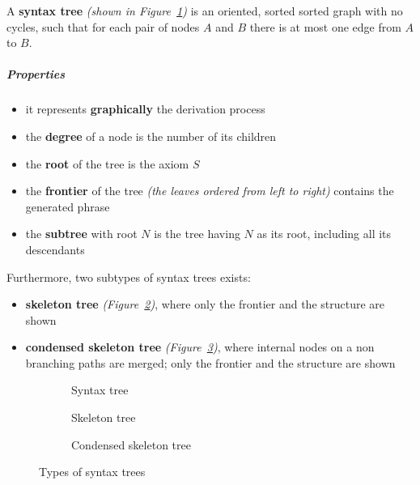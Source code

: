 \documentclass[english]{article}
\begin{document}
A \textbf{syntax tree} \textit{(shown in Figure~\ref{subfig:syntax-tree})} is an oriented, sorted sorted graph with no cycles, such that for each pair of nodes \(A\) and \(B\) there is at most one edge from \(A\) to \(B\).

\subparagraph*{Properties}

\begin{itemize}
  \item it represents \textbf{graphically} the derivation process
  \item the \textbf{degree} of a node is the number of its children
  \item the \textbf{root} of the tree is the axiom \(S\)
  \item the \textbf{frontier} of the tree \textit{(the leaves ordered from left to right)} contains the generated phrase
  \item the \textbf{subtree} with root \(N\) is the tree having \(N\) as its root, including all its descendants
\end{itemize}

Furthermore, two subtypes of syntax trees exists:

\begin{itemize}
  \item \textbf{skeleton tree} \textit{(Figure~\ref{subfig:skeleton-tree})}, where only the frontier and the structure are shown
  \item \textbf{condensed skeleton tree} \textit{(Figure~\ref{subfig:condensed-skeleton-tree})}, where internal nodes on a non branching paths are merged; only the frontier and the structure are shown
\end{itemize}

\begin{figure}[htbp]
  \bigskip
  \centering
  \begin{subfigure}[t]{0.99\textwidth}
    \bigskip
    \centering
    \caption{Syntax tree}
    \label{subfig:syntax-tree}
    \bigskip
  \end{subfigure}
  \bigskip
  \begin{subfigure}[t]{0.495\textwidth}
    \bigskip
    \centering
    \caption{Skeleton tree}
    \label{subfig:skeleton-tree}
    \bigskip
  \end{subfigure}
  \begin{subfigure}[t]{0.495\textwidth}
    \bigskip
    \centering
        \caption{Condensed skeleton tree}
    \label{subfig:condensed-skeleton-tree}
    \bigskip
  \end{subfigure}

  \caption{Types of syntax trees}
  \label{fig:types-of-syntax-trees}
\end{figure}
\end{document}
